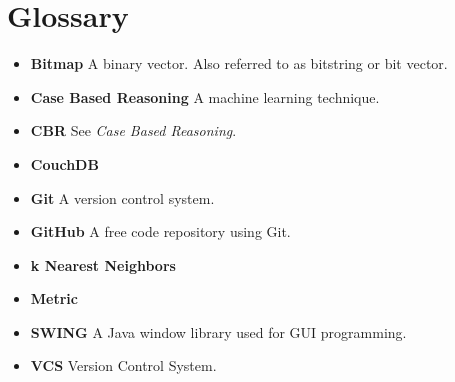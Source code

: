  

\chapter{Glossary}

\begin{itemize}
\item{\textbf{Bitmap}} A binary vector. Also referred to as bitstring
  or bit vector.
\item {\textbf{Case Based Reasoning}} A machine learning technique.
\item {\textbf{CBR}} See \emph{Case Based Reasoning}.
\item {\textbf{CouchDB}} 
\item {\textbf{Git}} A version control system.
\item {\textbf{GitHub}} A free code repository using Git.
\item {\textbf{k Nearest Neighbors}}
\item {\textbf{Metric}}
\item {\textbf{SWING}} A Java window library used for GUI programming.
\item{\textbf{VCS}} Version Control System. 

\end{itemize}